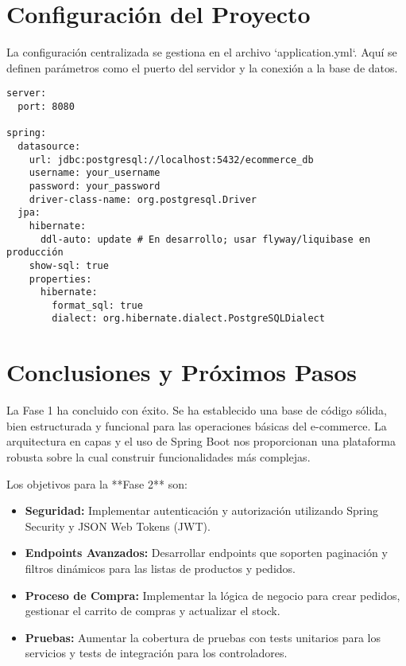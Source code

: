 \documentclass[12pt, a4paper]{article}
\begin{document}
\section{Configuración del Proyecto}
La configuración centralizada se gestiona en el archivo `application.yml`. Aquí se definen parámetros como el puerto del servidor y la conexión a la base de datos.

\begin{lstlisting}[style=yamlstyle, caption={Configuración en `application.yml`}, label=lst:appyaml]
server:
  port: 8080

spring:
  datasource:
    url: jdbc:postgresql://localhost:5432/ecommerce_db
    username: your_username
    password: your_password
    driver-class-name: org.postgresql.Driver
  jpa:
    hibernate:
      ddl-auto: update # En desarrollo; usar flyway/liquibase en producción
    show-sql: true
    properties:
      hibernate:
        format_sql: true
        dialect: org.hibernate.dialect.PostgreSQLDialect
\end{lstlisting}

\section{Conclusiones y Próximos Pasos}
La Fase 1 ha concluido con éxito. Se ha establecido una base de código sólida, bien estructurada y funcional para las operaciones básicas del e-commerce. La arquitectura en capas y el uso de Spring Boot nos proporcionan una plataforma robusta sobre la cual construir funcionalidades más complejas.

Los objetivos para la **Fase 2** son:
\begin{itemize}
    \item \textbf{Seguridad:} Implementar autenticación y autorización utilizando Spring Security y JSON Web Tokens (JWT).
    \item \textbf{Endpoints Avanzados:} Desarrollar endpoints que soporten paginación y filtros dinámicos para las listas de productos y pedidos.
    \item \textbf{Proceso de Compra:} Implementar la lógica de negocio para crear pedidos, gestionar el carrito de compras y actualizar el stock.
    \item \textbf{Pruebas:} Aumentar la cobertura de pruebas con tests unitarios para los servicios y tests de integración para los controladores.
\end{itemize}
\end{document}
